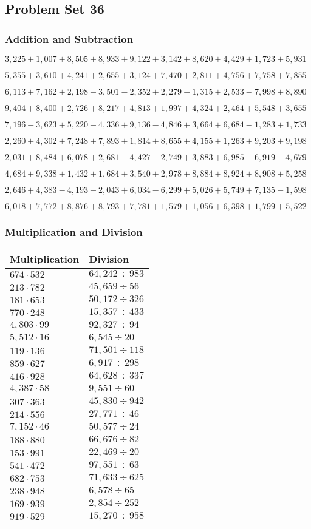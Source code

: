 \hypertarget{problem-set-36-3}{%
\subsection{Problem Set 36}\label{problem-set-36-3}}

\hypertarget{addition-and-subtraction-198}{%
\subsubsection{Addition and
Subtraction}\label{addition-and-subtraction-198}}

\(3,225+1,007+8,505+8,933+9,122+3,142+8,620+4,429+1,723+ 5,931\)

\(5,355+3,610+4,241+2,655+3,124+7,470+2,811+4,756+7,758+7,855\)

\(6,113+7,162+2,198-3,501-2,352+2,279-1,315+2,533-7,998+8,890\)

\(9,404+8,400+2,726+8,217+4,813+1,997+4,324+2,464+5,548+3,655\)

\(7,196-3,623+5,220-4,336+9,136-4,846+3,664+6,684-1,283+1,733\)

\(2,260+4,302+7,248+7,893+1,814+8,655+4,155+1,263+9,203+9,198\)

\(2,031+8,484+6,078+2,681-4,427-2,749+3,883+6,985-6,919-4,679\)

\(4,684+9,338+1,432+1,684+3,540+2,978+8,884+8,924+8,908+5,258\)

\(2,646+4,383-4,193-2,043+6,034-6,299+5,026+5,749+7,135-1,598\)

\(6,018+7,772+8,876+8,793+7,781+1,579+1,056+6,398+1,799+5,522\)

\hypertarget{multiplication-and-division-197}{%
\subsubsection{Multiplication and
Division}\label{multiplication-and-division-197}}

\begin{longtable}[]{@{}ll@{}}
\toprule
Multiplication & Division\tabularnewline
\midrule
\endhead
\(674\cdot532\) & \(64,242÷983\)\tabularnewline
\(213\cdot782\) & \(45,659÷56\)\tabularnewline
\(181\cdot653\) & \(50,172÷326\)\tabularnewline
\(770\cdot248\) & \(15,357÷433\)\tabularnewline
\(4,803\cdot99\) & \(92,327÷94\)\tabularnewline
\(5,512\cdot16\) & \(6,545÷20\)\tabularnewline
\(119\cdot136\) & \(71,501÷118\)\tabularnewline
\(859\cdot627\) & \(6,917÷298\)\tabularnewline
\(416\cdot928\) & \(64,628÷337\)\tabularnewline
\(4,387\cdot58\) & \(9,551÷60\)\tabularnewline
\(307\cdot363\) & \(45,830÷942\)\tabularnewline
\(214\cdot556\) & \(27,771÷46\)\tabularnewline
\(7,152\cdot46\) & \(50,577÷24\)\tabularnewline
\(188\cdot880\) & \(66,676÷82\)\tabularnewline
\(153\cdot991\) & \(22,469÷20\)\tabularnewline
\(541\cdot472\) & \(97,551÷63\)\tabularnewline
\(682\cdot753\) & \(71,633÷625\)\tabularnewline
\(238\cdot948\) & \(6,578÷65\)\tabularnewline
\(169\cdot939\) & \(2,854÷252\)\tabularnewline
\(919\cdot529\) & \(15,270÷958\)\tabularnewline
\bottomrule
\end{longtable}

